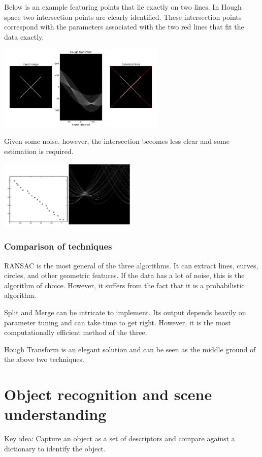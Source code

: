 \documentclass[twoside]{article}
\begin{document}
Below is an example featuring points that lie exactly on two lines. In Hough space two intersection points are clearly identified. These intersection points correspond with the parameters associated with the two red lines that fit the data exactly.

\begin{center}
	\includegraphics[width=0.6\textwidth]{hough5}
\end{center}

Given some noise, however, the intersection becomes less clear and some estimation is required.

\begin{center}
	\includegraphics[width=0.5\textwidth]{hough6}
\end{center}

\subsubsection{Comparison of techniques}
RANSAC is the most general of the three algorithms. It can extract lines, curves, circles, and other geometric features. If the data has a lot of noise, this is the algorithm of choice. However, it suffers from the fact that it is a probabilistic algorithm.

Split and Merge can be intricate to implement. Its output depends heavily on parameter tuning and can take time to get right. However, it is the most computationally efficient method of the three.

Hough Transform is an elegant solution and can be seen as the middle ground of the above two techniques.

\section{Object recognition and scene understanding}
Key idea: Capture an object as a set of descriptors and compare against a dictionary to identify the object. 
\end{document}
